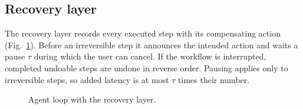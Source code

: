 \documentclass[conference]{IEEEtran}
\begin{document}
\subsection{Recovery layer}
The recovery layer records every executed step with its compensating action (Fig.~\ref{fig:algo}). Before an irreversible step it announces the intended action and waits a pause $\tau$ during which the user can cancel. If the workflow is interrupted, completed undoable steps are undone in reverse order. Pausing applies only to irreversible steps, so added latency is at most $\tau$ times their number.
\begin{figure}[t]\centering\small
{}
\caption{Agent loop with the recovery layer.}\label{fig:algo}
\end{figure}
\end{document}

